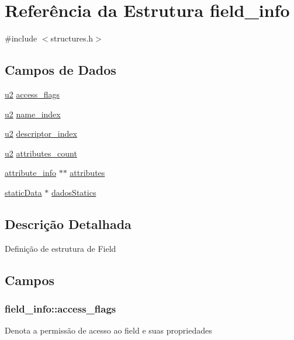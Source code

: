 \hypertarget{structfield__info}{}\section{Referência da Estrutura field\+\_\+info}
\label{structfield__info}


{\ttfamily \#include $<$structures.\+h$>$}

\subsection*{Campos de Dados}
\begin{DoxyCompactItemize}
\item 
\hyperlink{lista__operandos_8h_a732cde1300aafb73b0ea6c2558a7a54f}{u2} \hyperlink{structfield__info_aa622dc9a5b5353d2f3eb2f416dacab4b}{access\+\_\+flags}
\item 
\hyperlink{lista__operandos_8h_a732cde1300aafb73b0ea6c2558a7a54f}{u2} \hyperlink{structfield__info_a425e3ae85badd81c67ef00acca85ad9e}{name\+\_\+index}
\item 
\hyperlink{lista__operandos_8h_a732cde1300aafb73b0ea6c2558a7a54f}{u2} \hyperlink{structfield__info_a12dd492b7fb1d61da1ac14938d97b07f}{descriptor\+\_\+index}
\item 
\hyperlink{lista__operandos_8h_a732cde1300aafb73b0ea6c2558a7a54f}{u2} \hyperlink{structfield__info_a83bfa4ff84a608e3dbd1c3968ebe1b80}{attributes\+\_\+count}
\item 
\hyperlink{structattribute__info}{attribute\+\_\+info} $\ast$$\ast$ \hyperlink{structfield__info_a754de0f0fd6e62c413cca2979ca5debd}{attributes}
\item 
\hyperlink{structstaticData}{static\+Data} $\ast$ \hyperlink{structfield__info_aef0cb22b05664f3e93c74afa289fe865}{dados\+Statics}
\end{DoxyCompactItemize}


\subsection{Descrição Detalhada}
Definição de estrutura de Field 

\subsection{Campos}
\subsubsection[{\texorpdfstring{access\+\_\+flags}{access_flags}}]{ field\+\_\+info\+::access\+\_\+flags}\hypertarget{structfield__info_aa622dc9a5b5353d2f3eb2f416dacab4b}{}\label{structfield__info_aa622dc9a5b5353d2f3eb2f416dacab4b}
Denota a permissão de acesso ao field e suas propriedades 
